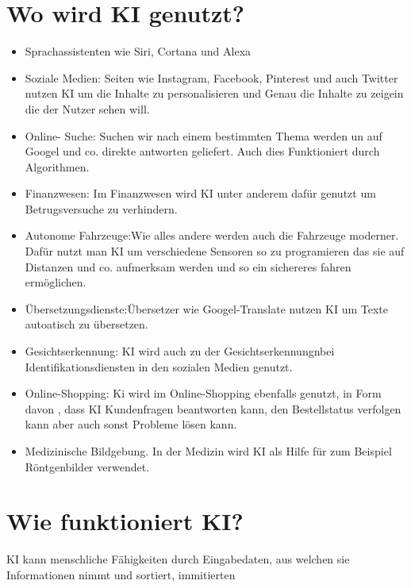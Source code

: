 \documentclass{report}
\begin{document}
\section{Wo wird KI genutzt?}
\begin{itemize}
\item Sprachassistenten wie Siri, Cortana und Alexa 
\item Soziale Medien: Seiten wie Instagram, Facebook, Pinterest und auch Twitter nutzen KI um die Inhalte zu personalisieren und Genau die Inhalte zu zeigein die der Nutzer sehen will.
\item Online- Suche: Suchen wir nach einem bestimmten Thema werden un auf Googel und co. direkte antworten geliefert. Auch dies Funktioniert durch Algorithmen.
\item Finanzwesen: Im Finanzwesen wird KI unter anderem dafür genutzt um Betrugsversuche zu verhindern.
\item Autonome Fahrzeuge:Wie alles andere werden auch die Fahrzeuge moderner. Dafür nutzt man KI um verschiedene Sensoren so zu programieren das sie auf Distanzen und co. aufmerksam werden und so ein sichereres fahren ermöglichen. 
\item Übersetzungsdienste:Übersetzer wie Googel-Translate nutzen KI um Texte autoatisch zu übersetzen. 
\item Gesichtserkennung: KI wird auch zu der Gesichtserkennungnbei Identifikationsdiensten in den sozialen Medien genutzt. 
\item Online-Shopping: Ki wird im Online-Shopping ebenfalls genutzt, in Form davon , dass KI Kundenfragen beantworten kann, den Bestellstatus verfolgen kann aber auch sonst Probleme lösen kann. 
\item Medizinische Bildgebung. In der Medizin wird KI als Hilfe für zum Beispiel Röntgenbilder verwendet. 
\end{itemize}

\section{Wie funktioniert KI?}
KI kann menschliche Fähigkeiten durch Eingabedaten, aus welchen sie Informationen nimmt und sortiert, immitierten
\end{document}
